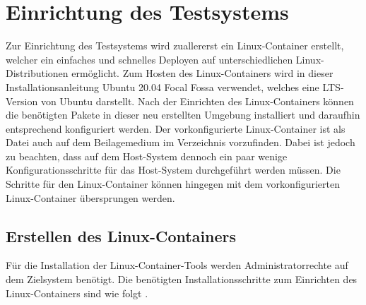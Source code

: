 \section{Einrichtung des Testsystems}\label{appendix1:Einrichtung_des_Testsystems}
Zur Einrichtung des Testsystems wird zuallererst ein Linux-Container erstellt, welcher ein einfaches und schnelles Deployen auf unterschiedlichen Linux-Distributionen ermöglicht. Zum Hosten des Linux-Containers wird in dieser Installationsanleitung Ubuntu 20.04 Focal Fossa verwendet, welches eine LTS-Version von Ubuntu darstellt. Nach der Einrichten des Linux-Containers können die benötigten Pakete in dieser neu erstellten Umgebung installiert und daraufhin entsprechend konfiguriert werden. Der vorkonfigurierte Linux-Container ist als Datei  auch auf dem Beilagemedium im Verzeichnis  vorzufinden. Dabei ist jedoch zu beachten, dass auf dem Host-System dennoch ein paar wenige Konfigurationsschritte für das Host-System durchgeführt werden müssen. Die Schritte für den Linux-Container können hingegen mit dem vorkonfigurierten Linux-Container übersprungen werden.

\subsection{Erstellen des Linux-Containers}
Für die Installation der Linux-Container-Tools werden Administratorrechte auf dem Zielsystem benötigt. Die benötigten Installationsschritte zum Einrichten des Linux-Containers sind wie folgt \cite{lxd_blog_nodate}.

